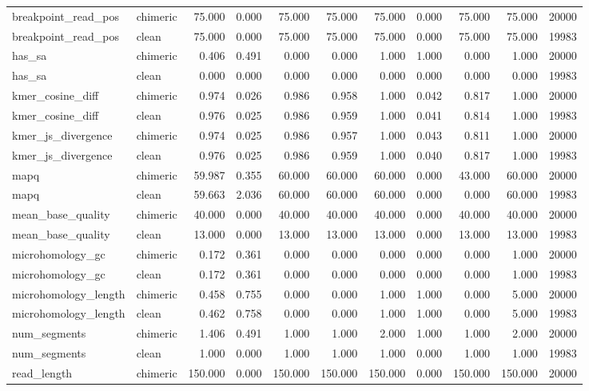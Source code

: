 \begin{landscape}
\begin{center}
\begin{longtable}{llrrrrrrrrr}
breakpoint\_read\_pos & chimeric & 75.000 & 0.000 & 75.000 & 75.000 & 75.000 & 0.000 & 75.000 & 75.000 & 20000 \\
breakpoint\_read\_pos & clean & 75.000 & 0.000 & 75.000 & 75.000 & 75.000 & 0.000 & 75.000 & 75.000 & 19983 \\
has\_sa & chimeric & 0.406 & 0.491 & 0.000 & 0.000 & 1.000 & 1.000 & 0.000 & 1.000 & 20000 \\
has\_sa & clean & 0.000 & 0.000 & 0.000 & 0.000 & 0.000 & 0.000 & 0.000 & 0.000 & 19983 \\
kmer\_cosine\_diff & chimeric & 0.974 & 0.026 & 0.986 & 0.958 & 1.000 & 0.042 & 0.817 & 1.000 & 20000 \\
kmer\_cosine\_diff & clean & 0.976 & 0.025 & 0.986 & 0.959 & 1.000 & 0.041 & 0.814 & 1.000 & 19983 \\
kmer\_js\_divergence & chimeric & 0.974 & 0.025 & 0.986 & 0.957 & 1.000 & 0.043 & 0.811 & 1.000 & 20000 \\
kmer\_js\_divergence & clean & 0.976 & 0.025 & 0.986 & 0.959 & 1.000 & 0.040 & 0.817 & 1.000 & 19983 \\
mapq & chimeric & 59.987 & 0.355 & 60.000 & 60.000 & 60.000 & 0.000 & 43.000 & 60.000 & 20000 \\
mapq & clean & 59.663 & 2.036 & 60.000 & 60.000 & 60.000 & 0.000 & 0.000 & 60.000 & 19983 \\
mean\_base\_quality & chimeric & 40.000 & 0.000 & 40.000 & 40.000 & 40.000 & 0.000 & 40.000 & 40.000 & 20000 \\
mean\_base\_quality & clean & 13.000 & 0.000 & 13.000 & 13.000 & 13.000 & 0.000 & 13.000 & 13.000 & 19983 \\
microhomology\_gc & chimeric & 0.172 & 0.361 & 0.000 & 0.000 & 0.000 & 0.000 & 0.000 & 1.000 & 20000 \\
microhomology\_gc & clean & 0.172 & 0.361 & 0.000 & 0.000 & 0.000 & 0.000 & 0.000 & 1.000 & 19983 \\
microhomology\_length & chimeric & 0.458 & 0.755 & 0.000 & 0.000 & 1.000 & 1.000 & 0.000 & 5.000 & 20000 \\
microhomology\_length & clean & 0.462 & 0.758 & 0.000 & 0.000 & 1.000 & 1.000 & 0.000 & 5.000 & 19983 \\
num\_segments & chimeric & 1.406 & 0.491 & 1.000 & 1.000 & 2.000 & 1.000 & 1.000 & 2.000 & 20000 \\
num\_segments & clean & 1.000 & 0.000 & 1.000 & 1.000 & 1.000 & 0.000 & 1.000 & 1.000 & 19983 \\
read\_length & chimeric & 150.000 & 0.000 & 150.000 & 150.000 & 150.000 & 0.000 & 150.000 & 150.000 & 20000 \\

\end{longtable}
\end{center}
\end{landscape}
